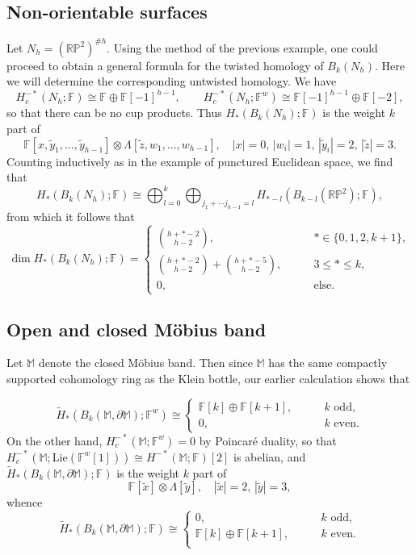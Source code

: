 \documentclass{compositio}
\theoremstyle{definition}\newtheorem{definition}{Definition}[section]
\theoremstyle{theorem}\newtheorem{lemma}[definition]{Lemma}
\theoremstyle{remark}\newtheorem*{conventions}{Conventions}
\theoremstyle{remark}\newtheorem*{acknowledgments}{Acknowledgments}
\theoremstyle{remark}\newtheorem*{outline}{Outline}
\theoremstyle{remark}\newtheorem*{questions}{Questions}
\theoremstyle{remark}\newtheorem{example}[definition]{Example}
\theoremstyle{definition}\newtheorem{construction}[definition]{Construction}
\theoremstyle{definition}\newtheorem*{convention}{Convention}
\theoremstyle{definition}\newtheorem*{conjecture}{Conjecture}
\theoremstyle{theorem}\newtheorem{theorem}[definition]{Theorem}
\theoremstyle{theorem}\newtheorem{paradigm}[definition]{Paradigm}
\theoremstyle{remark}\newtheorem{remark}[definition]{Remark}
\theoremstyle{corollary}\newtheorem{corollary}[definition]{Corollary}
\theoremstyle{theorem}\newtheorem{proposition}[definition]{Proposition}
\theoremstyle{definition}\newtheorem{question}[definition]{Question}
\begin{document}
\subsection{Non-orientable surfaces}
Let $N_h=(\mathbb{RP}^2)^{\#h}$. Using the method of the previous example, one could proceed to obtain a general formula for the twisted homology of $B_k(N_h)$. Here we will determine the corresponding untwisted homology. We have $$H_c^{-*}(N_h;\mathbb{F})\cong\mathbb{F}\oplus\mathbb{F}[-1]^{h-1},\qquad H_c^{-*}(N_h; \mathbb{F}^w)\cong\mathbb{F}[-1]^{h-1}\oplus\mathbb{F}[-2],$$ so that there can be no cup products. Thus $H_*(B_k(N_h);\mathbb{F})$ is the weight $k$ part of $$\mathbb{F}[x, \tilde y_1,\ldots, \tilde y_{h-1}]\otimes \Lambda[\tilde z, w_1,\ldots, w_{h-1}],\quad |x|=0,\,|w_i|=1,\,|\tilde y_i|=2,\,|\tilde z|=3.$$ Counting inductively as in the example of punctured Euclidean space, we find that $$H_*(B_k(N_h);\mathbb{F})\cong \bigoplus_{l=0}^k\bigoplus_{j_1+\cdots j_{h-1}=l}H_{*-l}(B_{k-l}(\mathbb{RP}^2);\mathbb{F}),$$ from which it follows that $$\dim H_*(B_k(N_h);\mathbb{F})=\begin{cases}
\binom{h+*-2}{h-2},\qquad &*\in\{0,1,2, k+1\},\\
\binom{h+*-2}{h-2}+\binom{h+*-5}{h-2},\qquad &3\leq *\leq k,\\
0,\qquad &\text{else.}
\end{cases}$$

\subsection{Open and closed M\"{o}bius band} Let $\mathbb{M}$ denote the closed M\"{o}bius band. Then since $\mathbb{M}$ has the same compactly supported cohomology ring as the Klein bottle, our earlier calculation shows that 

$$\widetilde{H}_*(B_k(\mathbb{M},\partial \mathbb{M});\mathbb{F}^w)\cong\begin{cases}
\mathbb{F}[k]\oplus \mathbb{F}[k+1],\qquad &k\text{ odd,}\\
0,\qquad\qquad &k\text{ even.}
\end{cases}$$ On the other hand, $H_c^{-*}(\mathbb{M};\mathbb{F}^w)=0$ by Poincar\'{e} duality, so that $H_c^{-*}(\mathbb{M}; {\mathrm{Lie}}(\mathbb{F}^w[1]))\cong H^{-*}(\mathbb{M};\mathbb{F})[2]$ is abelian, and $\widetilde{H}_*(B_k(\mathbb{M},\partial \mathbb{M});\mathbb{F})$ is the weight $k$ part of $$\mathbb{F}[\tilde x]\otimes\Lambda[\tilde y],\quad |\tilde x|=2,\,|\tilde y|=3,$$ whence $$\widetilde{H}_*(B_k(\mathbb{M},\partial \mathbb{M});\mathbb{F})\cong\begin{cases}
0,\qquad & k\text{ odd,}\\
\mathbb{F}[k]\oplus\mathbb{F}[k+1],\qquad & k\text{ even.}\\
\end{cases}$$
\end{document}
